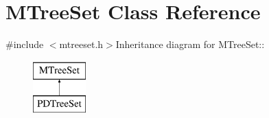 \hypertarget{classMTreeSet}{
\section{MTreeSet Class Reference}
\label{classMTreeSet}
}


{\ttfamily \#include $<$mtreeset.h$>$}Inheritance diagram for MTreeSet::\begin{figure}[H]
\begin{center}
\leavevmode
\includegraphics[height=2cm]{classMTreeSet}
\end{center}
\end{figure}
